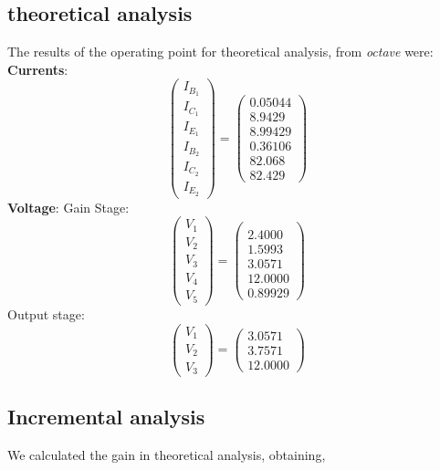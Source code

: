 \subsection{theoretical analysis}
The results of the operating point for theoretical analysis, from \textit{octave}
were:
\textbf{Currents}:
\begin{equation}
\left(\begin{array}{c} I_{B_1} \\ I_{C_1} \\ I_{E_1} \\I_{B_2} \\ I_{C_2} \\ I_{E_2} \end{array}\right) 
= \left(\begin{array}{c} 0.05044 \\ 8.9429 \\ 8.99429 \\ 0.36106\\ 82.068 \\ 82.429 \end{array}\right)
\end{equation}
\textbf{Voltage}:
Gain Stage:
\begin{equation}
\left(\begin{array}{c} V_1 \\ V_2\\ V_3 \\ V_4 \\ V_5 \end{array}\right) 
= \left(\begin{array}{c} \\ 2.4000 \\ 1.5993\\ 3.0571 \\ 12.0000 \\0.89929 \end{array}\right)
\end{equation}
Output stage:
\begin{equation}
\left(\begin{array}{c} V_1 \\ V_2\\ V_3  \end{array}\right) 
= \left(\begin{array}{c} 3.0571 \\ 3.7571 \\ 12.0000
\end{array}\right)
\end{equation}
\subsection{Incremental analysis}
We calculated the gain in theoretical analysis, obtaining, 


